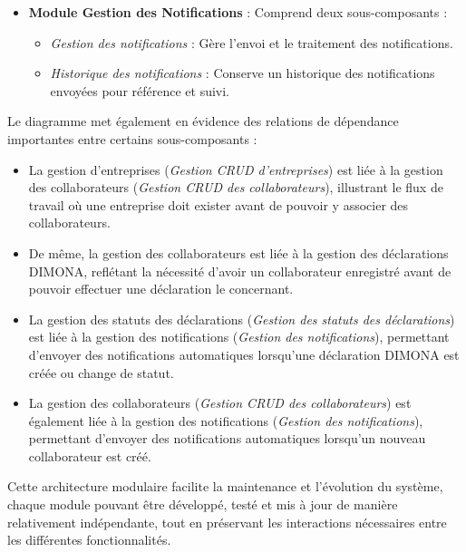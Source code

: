\begin{itemize}[leftmargin=*,label=\textcolor{darkgray}{$\bullet$},itemsep=0.3em]
  \item \textbf{Module Gestion des Notifications} : Comprend deux sous-composants :
    \begin{itemize}[leftmargin=*,label=\textcolor{darkgray}{$\bullet$},itemsep=0.3em]
      \item \textit{Gestion des notifications} : Gère l'envoi et le traitement des notifications.
      \item \textit{Historique des notifications} : Conserve un historique des notifications envoyées pour référence et suivi.
    \end{itemize}
\end{itemize}

\vspace{0.5cm}

\noindent Le diagramme met également en évidence des relations de dépendance importantes entre certains sous-composants :
\begin{itemize}[leftmargin=*,label=\textcolor{darkgray}{$\bullet$},itemsep=0.3em]
  \item La gestion d'entreprises (\textit{Gestion CRUD d'entreprises}) est liée à la gestion des collaborateurs (\textit{Gestion CRUD des collaborateurs}), illustrant le flux de travail où une entreprise doit exister avant de pouvoir y associer des collaborateurs.
  \item De même, la gestion des collaborateurs est liée à la gestion des déclarations DIMONA, reflétant la nécessité d'avoir un collaborateur enregistré avant de pouvoir effectuer une déclaration le concernant.
  \item La gestion des statuts des déclarations (\textit{Gestion des statuts des déclarations}) est liée à la gestion des notifications (\textit{Gestion des notifications}), permettant d'envoyer des notifications automatiques lorsqu'une déclaration DIMONA est créée ou change de statut.
  \item La gestion des collaborateurs (\textit{Gestion CRUD des collaborateurs}) est également liée à la gestion des notifications (\textit{Gestion des notifications}), permettant d'envoyer des notifications automatiques lorsqu'un nouveau collaborateur est créé.
\end{itemize}

\vspace{0.5cm}

\begin{tcolorbox}[
  title={\textbf{Architecture modulaire de SecuCom}},
  colback=blue!5!white,
  colframe=primarycolor,
  fonttitle=\bfseries,
  boxrule=0.5mm,
  arc=2mm,
  left=6mm,
  right=6mm,
  top=6mm,
  bottom=6mm
]
Cette architecture modulaire facilite la maintenance et l'évolution du système, chaque module pouvant être développé, testé et mis à jour de manière relativement indépendante, tout en préservant les interactions nécessaires entre les différentes fonctionnalités.
\end{tcolorbox}

